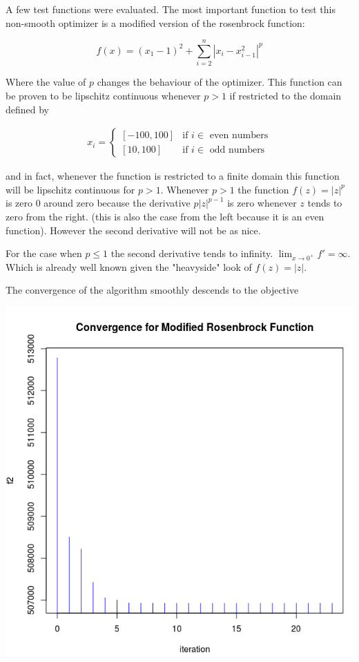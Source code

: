 A few test functions were evaluated. The most important function to test this non-smooth optimizer is a modified version of the rosenbrock function:

\begin{equation}
    f(x) = (x_1 - 1)^2 + \sum_{i = 2}^n |x_i - x_{i - 1}^2|^p
\end{equation}

Where the value of $p$ changes the behaviour of the optimizer. This function can be proven to be lipschitz continuous whenever $p > 1$ if restricted to the domain defined by  

\begin{equation}
  \begin{aligned}
    x_i = 
    \begin{cases}
      [-100, 100] & \text{if } i \in \text{ even numbers} \\
      [10, 100] & \text{if } i \in \text{ odd numbers}
    \end{cases}
  \end{aligned}
\end{equation}

and in fact, whenever the function is restricted to a finite domain this function will be lipschitz continuous for $p > 1$. Whenever $p > 1$ the function $f(z) = |z|^p$ is zero $0$ around zero because the derivative $p |z| ^{p-1}$ is zero whenever $z$ tends to zero from the right. (this is also the case from the left because it is an even function). However the second derivative will not be as nice.

For the case when $p \leq 1$ the second derivative tends to infinity. $\displaystyle \lim_{x \to 0^+} {f' = \infty}$. Which is already well known given the "heavyside" look of $f(z) = |z|$.

The convergence of the algorithm smoothly descends to the objective 

\begin{center}
\includegraphics[scale=0.3]{Figures/convergence.png}
\end{center}

